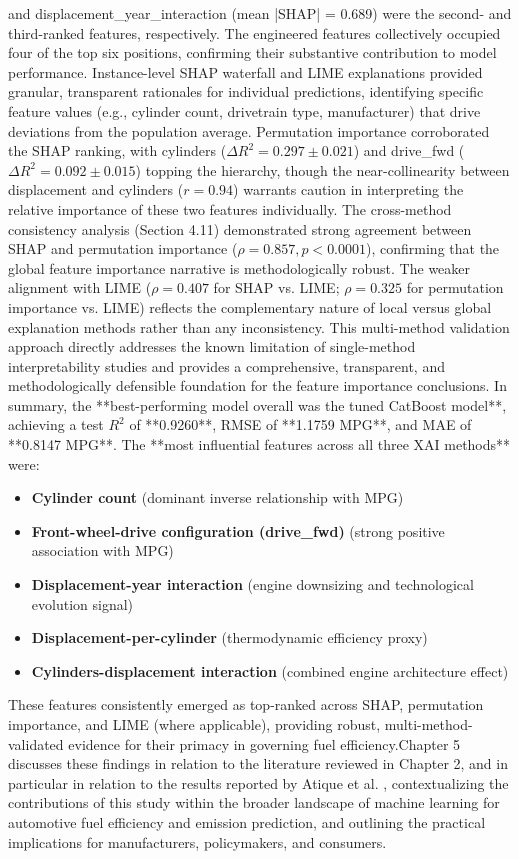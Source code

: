 and displacement\_year\_interaction (mean |SHAP| = 0.689) were the second- and third-ranked features, respectively. The engineered features collectively occupied four of the top six positions, confirming their substantive contribution to model performance. Instance-level SHAP waterfall and LIME explanations provided granular, transparent rationales for individual predictions, identifying specific feature values (e.g., cylinder count, drivetrain type, manufacturer) that drive deviations from the population average. Permutation importance corroborated the SHAP ranking, with cylinders (\(\Delta R^2 = 0.297 \pm 0.021\)) and drive\_fwd (\(\Delta R^2 = 0.092 \pm 0.015\)) topping the hierarchy, though the near-collinearity between displacement and cylinders (\(r = 0.94\)) warrants caution in interpreting the relative importance of these two features individually.
The cross-method consistency analysis (Section 4.11) demonstrated strong agreement between SHAP and permutation importance (\(\rho = 0.857, p < 0.0001\)), confirming that the global feature importance narrative is methodologically robust. The weaker alignment with LIME (\(\rho = 0.407\) for SHAP vs. LIME; \(\rho = 0.325\) for permutation importance vs. LIME) reflects the complementary nature of local versus global explanation methods rather than any inconsistency. This multi-method validation approach directly addresses the known limitation of single-method interpretability studies and provides a comprehensive, transparent, and methodologically defensible foundation for the feature importance conclusions.
In summary, the **best-performing model overall was the tuned CatBoost model**, achieving a test \(R^2\) of **0.9260**, RMSE of **1.1759 MPG**, and MAE of **0.8147 MPG**. The **most influential features across all three XAI methods** were:
\begin{itemize}
    \item \textbf{Cylinder count} (dominant inverse relationship with MPG)
    \item \textbf{Front-wheel-drive configuration (drive\_fwd)} (strong positive association with MPG)
    \item \textbf{Displacement-year interaction} (engine downsizing and technological evolution signal)
    \item \textbf{Displacement-per-cylinder} (thermodynamic efficiency proxy)
    \item \textbf{Cylinders-displacement interaction} (combined engine architecture effect)
\end{itemize}
These features consistently emerged as top-ranked across SHAP, permutation importance, and LIME (where applicable), providing robust, multi-method-validated evidence for their primacy in governing fuel efficiency.Chapter 5 discusses these findings in relation to the literature reviewed in Chapter 2, and in particular in relation to the results reported by Atique et al. \cite{atique2026explainable}, contextualizing the contributions of this study within the broader landscape of machine learning for automotive fuel efficiency and emission prediction, and outlining the practical implications for manufacturers, policymakers, and consumers.